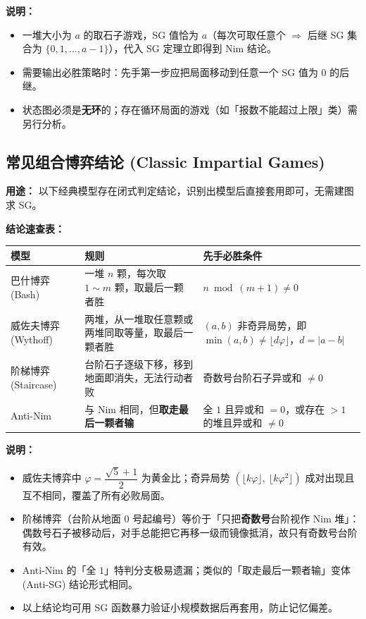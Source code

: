 

\textbf{说明：}
\begin{itemize}
    \item 一堆大小为 $a$ 的取石子游戏，SG 值恰为 $a$（每次可取任意个 $\Rightarrow$ 后继 SG 集合为 $\{0,1,\dots,a-1\}$），代入 SG 定理立即得到 Nim 结论。
    \item 需要输出必胜策略时：先手第一步应把局面移动到任意一个 SG 值为 $0$ 的后继。
    \item 状态图必须是\textbf{无环}的；存在循环局面的游戏（如「报数不能超过上限」类）需另行分析。
\end{itemize}

\subsection{常见组合博弈结论 (Classic Impartial Games)}

\textbf{用途：}
以下经典模型存在闭式判定结论，识别出模型后直接套用即可，无需建图求 SG。

\textbf{结论速查表：}

\begin{center}
\begin{tabularx}{\textwidth}{|l|X|X|}
\hline
\textbf{模型} & \textbf{规则} & \textbf{先手必胜条件} \\ \hline
巴什博弈 (Bash) & 一堆 $n$ 颗，每次取 $1\sim m$ 颗，取最后一颗者胜 & $n \bmod (m+1) \ne 0$ \\ \hline
威佐夫博弈 (Wythoff) & 两堆，从一堆取任意颗或两堆同取等量，取最后一颗者胜 & $(a,b)$ 非奇异局势，即 $\min(a,b) \ne \lfloor d\varphi \rfloor$，$d=|a-b|$ \\ \hline
阶梯博弈 (Staircase) & 台阶石子逐级下移，移到地面即消失，无法行动者败 & 奇数号台阶石子异或和 $\ne 0$ \\ \hline
Anti-Nim & 与 Nim 相同，但\textbf{取走最后一颗者输} & 全 $1$ 且异或和 $=0$，或存在 $>1$ 的堆且异或和 $\ne 0$ \\ \hline
\end{tabularx}
\end{center}

\textbf{说明：}
\begin{itemize}
    \item 威佐夫博弈中 $\varphi=\dfrac{\sqrt5+1}{2}$ 为黄金比；奇异局势 $(\lfloor k\varphi\rfloor,\ \lfloor k\varphi^2\rfloor)$ 成对出现且互不相同，覆盖了所有必败局面。
    \item 阶梯博弈（台阶从地面 $0$ 号起编号）等价于「只把\textbf{奇数号}台阶视作 Nim 堆」：偶数号石子被移动后，对手总能把它再移一级而镜像抵消，故只有奇数号台阶有效。
    \item Anti-Nim 的「全 $1$」特判分支极易遗漏；类似的「取走最后一颗者输」变体 (Anti-SG) 结论形式相同。
    \item 以上结论均可用 SG 函数暴力验证小规模数据后再套用，防止记忆偏差。
\end{itemize}


